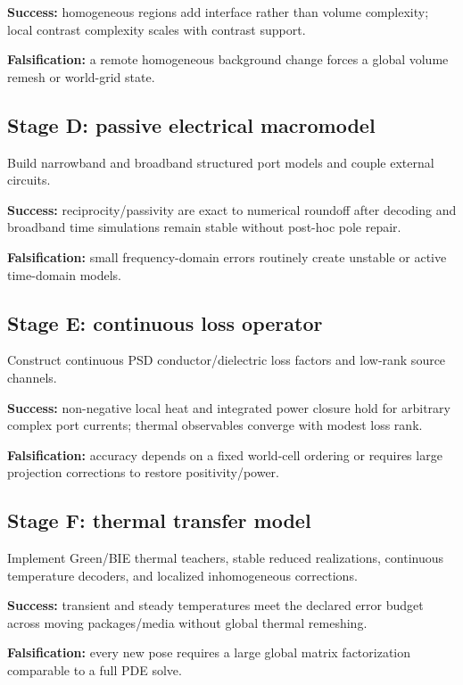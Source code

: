 \textbf{Success:} homogeneous regions add interface rather than volume
complexity; local contrast complexity scales with contrast support.

\textbf{Falsification:} a remote homogeneous background change forces a global
volume remesh or world-grid state.

\subsection{Stage D: passive electrical macromodel}

Build narrowband and broadband structured port models and couple external
circuits.

\textbf{Success:} reciprocity/passivity are exact to numerical roundoff after
decoding and broadband time simulations remain stable without post-hoc pole
repair.

\textbf{Falsification:} small frequency-domain errors routinely create unstable
or active time-domain models.

\subsection{Stage E: continuous loss operator}

Construct continuous PSD conductor/dielectric loss factors and low-rank source
channels.

\textbf{Success:} non-negative local heat and integrated power closure hold for
arbitrary complex port currents; thermal observables converge with modest loss
rank.

\textbf{Falsification:} accuracy depends on a fixed world-cell ordering or
requires large projection corrections to restore positivity/power.

\subsection{Stage F: thermal transfer model}

Implement Green/BIE thermal teachers, stable reduced realizations, continuous
temperature decoders, and localized inhomogeneous corrections.

\textbf{Success:} transient and steady temperatures meet the declared error
budget across moving packages/media without global thermal remeshing.

\textbf{Falsification:} every new pose requires a large global matrix
factorization comparable to a full PDE solve.

